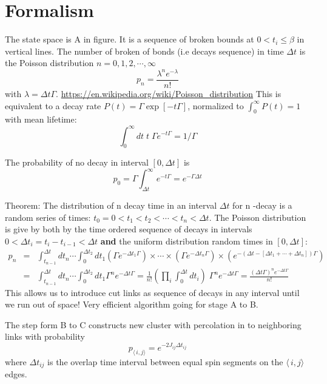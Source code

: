 \documentclass[12pt]{article}
\numberwithin{equation}{section}
\numberwithin{figure}{section}
\newcommand{\be}{\begin{equation}}
\newcommand{\ee}{\end{equation}}
\newcommand{\bea}{\begin{eqnarray}}
\newcommand{\eea}{\end{eqnarray}}
\newcommand{\<}{\langle\,}
\renewcommand{\>}{\rangle}
\newcommand\nn{\nonumber \\}
\begin{document}
\section{Formalism}


The state space is A in figure. It is a sequence of broken bounds at
$0 < t_i \le \beta$ in vertical lines.  The number of broken  of bonds
(i.e decays sequence) in time $ \Delta t$ is the Poisson distribution $n =  0,1,2, \cdots, \infty$ 
\be
p_n  =\frac{ \lambda^n e^{ \textstyle - \lambda}}{n!} 
\ee
with $\lambda =  \Delta t \Gamma$.
\href{https://en.wikipedia.org/wiki/Poisson\_distribution}{https://en.wikipedia.org/wiki/Poisson\_distribution}
This is equivalent to a decay rate $P(t) = \Gamma \exp[ -t \Gamma]$, normalized to  $\int^\infty_0 P(t) = 1$ with mean lifetime:
\be
\int^\infty_0 dt \;   t  \; \Gamma e^{\textstyle - t \Gamma} = 1/\Gamma
\ee


The probability of no decay in interval $[0,\Delta t ]$ is 
\be
p_0 = \Gamma \int^\infty_{\Delta t}   e^{\textstyle - t \Gamma}   =
e^{\textstyle - \Gamma \Delta t}
\ee

Theorem: The distribution of  n decay time in an interval $\Delta t $ for n -decay is
a random series of times: $t_0 = 0 < t_1 < t_2 < \cdots<  t_n < \Delta t $.
The Poisson distribution is give by both by the time ordered sequence of
 decays in  intervals $0<\Delta t_i = t_i - t_{i-1}< \Delta t$ {\bf and} the
uniform distribution random times in $[ 0,\Delta t]$:
\bea
p_n &=&  \int^{\Delta t}_{t_{n-1}} dt_n  \cdots  \int^{\Delta t_2}_{0} dt_1  (\Gamma e^{\textstyle  - \Delta t_1 \Gamma}) 
\times \cdots \times  ( \Gamma e^{\textstyle  - \Delta t_n\Gamma}) \times ( e^{\textstyle  - (\Delta
  t -   [ \Delta t_1+ \cdots + \Delta t_n]) \Gamma}) \nn
&=&  \int^{\Delta t}_{t_{n-1}} dt_n  \cdots  \int^{\Delta t_2}_{0} dt_1  \Gamma^n e^{\textstyle  - \Delta t \Gamma} = \frac{1}{n!} (\prod_i \int^{\Delta t}_0 dt_i ) \; \Gamma^n e^{\textstyle - \Delta t \Gamma}  =   \frac{ (\Delta t \Gamma)^n e^{\textstyle - \Delta t \Gamma} }{n!} 
\eea
This allows us to introduce cut links as sequence of decays in any interval until we run out
of space! Very efficient algorithm going for stage A to B.

The step form B to C constructs new cluster with percolation in to
neighboring links with probability
\be
p_{\<i,j\>} = e^{\textstyle - 2 J_{ij} \Delta t_{ij}}
\ee
where $\Delta t_{ij}$ is the overlap time interval between equal spin
segments on the $\<i,j\>$ edges.
\end{document}
